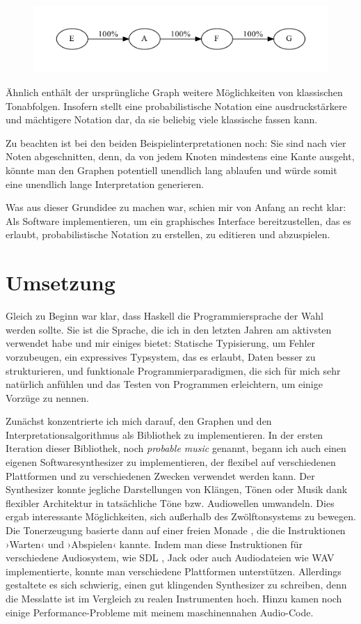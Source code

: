 \documentclass[a4paper,twocolumn]{article}
\begin{document}
\begin{figure}[h]
\includegraphics[width=.5\textwidth]{example-graph-interpretation2}
\end{figure}

Ähnlich enthält der ursprüngliche Graph weitere Möglichkeiten von klassischen
Tonabfolgen. Insofern stellt eine probabilistische Notation eine
ausdruckstärkere und mächtigere Notation dar, da sie beliebig viele klassische
fassen kann.

Zu beachten ist bei den beiden
Beispielinterpretationen noch: Sie sind nach vier Noten abgeschnitten, denn, da
von jedem Knoten mindestens eine Kante ausgeht, könnte man den Graphen
potentiell unendlich lang ablaufen und würde somit eine unendlich lange
Interpretation generieren.

Was aus dieser Grundidee zu machen war, schien mir von Anfang an recht klar: Als
Software implementieren, um ein graphisches Interface bereitzustellen, das es
erlaubt, probabilistische Notation zu erstellen, zu editieren und abzuspielen.

\section*{Umsetzung}

Gleich zu Beginn war klar, dass Haskell die Programmiersprache der Wahl werden
sollte. Sie ist die Sprache, die ich in den letzten Jahren am aktivsten
verwendet habe und mir einiges bietet: Statische Typisierung, um Fehler
vorzubeugen, ein expressives Typsystem, das es erlaubt, Daten besser zu
strukturieren, und funktionale Programmierparadigmen, die sich für mich sehr
natürlich anfühlen und das Testen von Programmen erleichtern, um einige Vorzüge zu nennen.

Zunächst konzentrierte ich mich darauf, den Graphen und den
Interpretationsalgorithmus als Bibliothek zu implementieren. In der ersten
Iteration dieser Bibliothek, noch {\it probable music} genannt, begann ich auch
einen eigenen Softwaresynthesizer zu implementieren, der flexibel auf
verschiedenen Plattformen und zu verschiedenen Zwecken verwendet werden kann.
Der Synthesizer konnte jegliche Darstellungen von Klängen, Tönen oder Musik dank
flexibler Architektur in tatsächliche Töne bzw. Audiowellen umwandeln. Dies
ergab interessante Möglichkeiten, sich außerhalb des
Zwölftonsystems zu bewegen. Die Tonerzeugung basierte dann auf einer freien
Monade \cite{free_monad}, die die Instruktionen ›Warten‹ und ›Abspielen‹ kannte.
Indem man diese Instruktionen für verschiedene Audiosystem, wie SDL \cite{sdl},
Jack \cite{jack} oder auch Audiodateien wie WAV \cite{wav} implementierte,
konnte man verschiedene Plattformen unterstützen. Allerdings gestaltete es sich
schwierig, einen gut klingenden Synthesizer zu schreiben, denn die
Messlatte ist im Vergleich zu realen Instrumenten hoch. Hinzu kamen noch einige
Performance-Probleme mit meinem maschinennahen Audio-Code.
\end{document}

